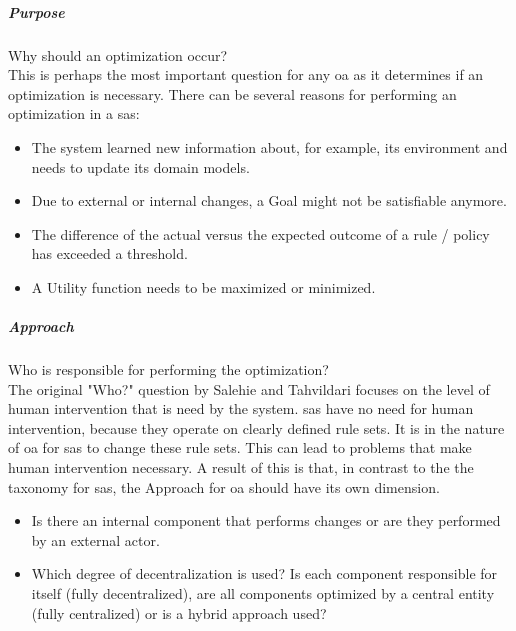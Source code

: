 \subparagraph*{Purpose}
Why should an optimization occur? \\
This is perhaps the most important question for any \acrshort{oa} as it determines if an optimization is necessary.
There can be several reasons for performing an optimization in a \acrshort{sas}:
\begin{itemize}[nosep]
    \item The system learned new information about, for example, its environment and needs to update its domain models.
    \item Due to external or internal changes, a Goal might not be satisfiable anymore.
    \item The difference of the actual versus the expected outcome of a rule / policy has exceeded a threshold.
    \item A Utility function needs to be maximized or minimized.
\end{itemize}

\subparagraph*{Approach}
Who is responsible for performing the optimization? \\
The original "Who?" question by Salehie and Tahvildari focuses on the level of human intervention that is need by the system.
\acrshort{sas} have no need for human intervention, because they operate on clearly defined rule sets.
It is in the nature of \acrshort{oa} for \acrshort{sas} to change these rule sets.
This can lead to problems that make human intervention necessary.
A result of this is that, in contrast to the the taxonomy for \acrshort{sas}, 
the Approach for \acrshort{oa} should have its own dimension.
\begin{itemize}[nosep]
    \item Is there an internal component that performs changes or are they performed by an external actor.
    \item Which degree of decentralization is used?
    Is each component responsible for itself (fully decentralized), are all components optimized by a central entity (fully centralized)
    or is a hybrid approach used?
\end{itemize}

